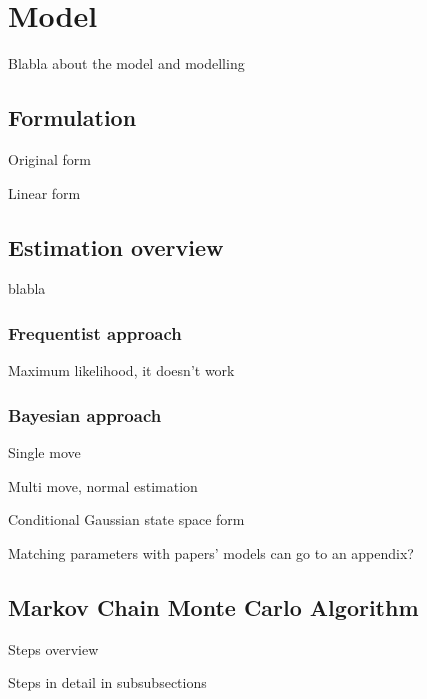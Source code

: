 \section{Model}

Blabla about the model and modelling

\subsection{Formulation}

Original form

Linear form

\subsection{Estimation overview}

blabla

\subsubsection{Frequentist approach}

Maximum likelihood, it doesn't work

\subsubsection{Bayesian approach}

Single move

Multi move, normal estimation

Conditional Gaussian state space form

Matching parameters with papers' models can go to an appendix?

\subsection[MCMC Algorithm]{Markov Chain Monte Carlo Algorithm}

Steps overview

Steps in detail in subsubsections